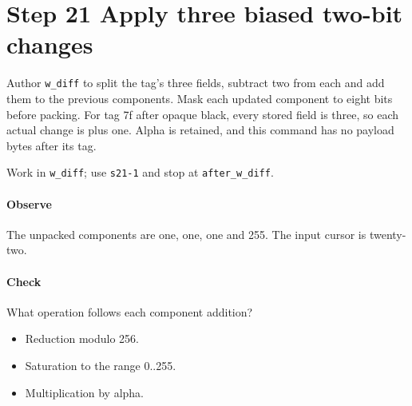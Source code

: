 \section{Step 21 Apply three biased two-bit changes}\label{qoi-s21}
Author \texttt{w\_diff} to split the tag’s three fields, subtract two from each and add them to the previous components. Mask each updated component to eight bits before packing. For tag 7f after opaque black, every stored field is three, so each actual change is plus one. Alpha is retained, and this command has no payload bytes after its tag.

Work in \texttt{w\_diff}; use \texttt{s21-1} and stop at \texttt{after\_w\_diff}.

\paragraph{Observe} The unpacked components are one, one, one and 255. The input cursor is twenty-two.

\paragraph{Check} What operation follows each component addition?
\begin{itemize}
\item[A.] Reduction modulo 256.
\item[B.] Saturation to the range 0..255.
\item[C.] Multiplication by alpha.
\end{itemize}
